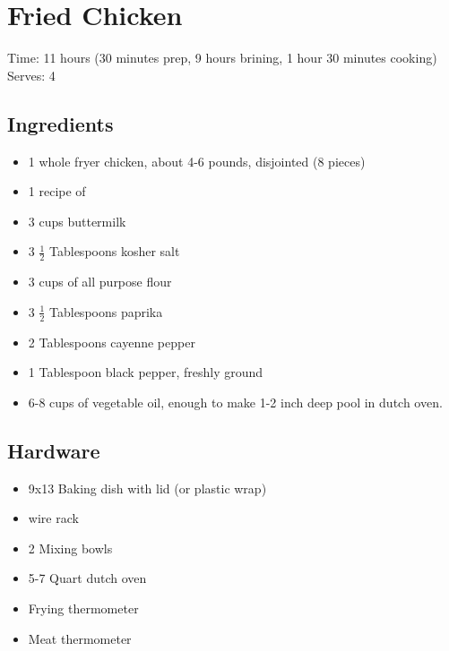 \section{Fried Chicken}
\label{friedChicken}
\setcounter{secnumdepth}{0}
Time: 11 hours (30 minutes prep, 9 hours brining, 1 hour 30 minutes cooking)
Serves: 4

\begin{multicols}{2}
\subsection*{Ingredients}
\begin{itemize}
    \item 1 whole fryer chicken, about 4-6 pounds, disjointed (8 pieces)
    \item 1 recipe of 
    \item 3 cups buttermilk
    \item 3 \( \frac{1}{2} \) Tablespoons kosher salt
    \item 3 cups of all purpose flour
    \item 3 \( \frac{1}{2} \) Tablespoons paprika
    \item 2 Tablespoons cayenne pepper
    \item 1 Tablespoon black pepper, freshly ground
    \item 6-8 cups of vegetable oil, enough to make 1-2 inch deep pool in dutch oven.
\end{itemize}

\subsection*{Hardware}
\begin{itemize}
    \item 9x13 Baking dish with lid (or plastic wrap)
    \item wire rack
    \item 2 Mixing bowls
    \item 5-7 Quart dutch oven
    \item Frying thermometer
    \item Meat thermometer
\end{itemize}
\clearpage


\end{multicols}
